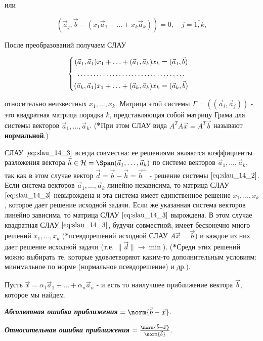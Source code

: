 или

$$(\vec{a}_j, \vec{b} - (x_1\vec{a}_1 + \ldots + x_k\vec{a}_k)) = 0, \quad j = \overline{1, k},$$

\bigbreak

После преобразований получаем СЛАУ

\begin{equation}
    \begin{cases}
        \begin{aligned}
            (\vec{a}_1, \vec{a}_1) x_1 + \ldots + (\vec{a}_1, \vec{a}_k)x_k &= (\vec{a}_1, \vec{b}) \\
            \hdotsfor{2} \\
            (\vec{a}_k, \vec{a}_1) x_1 + \ldots + (\vec{a}_k, \vec{a}_k)x_k &= (\vec{a}_k, \vec{b}) \\
        \end{aligned}
    \end{cases}
    \label{eq:slau_14_3}
\end{equation}

относительно неизвестных $x_1, \ldots, x_k$. Матрица этой системы $\Gamma = ((\vec{a}_i, \vec{a}_j))$ - это квадратная матрица порядка $k$, представляющая собой матрицу Грама для системы векторов $\vec{a}_1, \ldots, \vec{a}_k$. (\textbf{*}При этом СЛАУ вида $A^TA\vec{x} = A^T\vec{b}$ называют \textbf{нормальной}.)

СЛАУ $\eqref{eq:slau_14_3}$ всегда совместна: ее решениями являются коэффициенты разложения вектора $\vec{h} \in \mathcal{H} = \Span(\vec{a}_1, \ldots, \vec{a}_k)$ по системе векторов $\vec{a}_1, \ldots, \vec{a}_k$, так как в этом случае вектор $\vec{d} = \vec{b} - \vec{h} = \vec{h}^\perp$ - решение системы $\eqref{eq:slau_14_2}$. Если система векторов $\vec{a}_1, \ldots, \vec{a}_k$ линейно независима, то матрица СЛАУ $\eqref{eq:slau_14_3}$ невырождена и эта система имеет единственное решение $x_1, \ldots, x_k$, которое дает решение исходной задачи. Если же указанная система векторов линейно зависима, то матрица СЛАУ $\eqref{eq:slau_14_3}$ вырождена. В этом случае квадратная СЛАУ $\eqref{eq:slau_14_3}$, будучи совместной, имеет бесконечно много решений $x_1, \ldots, x_k$ (\textbf{*}псевдорешений исходной СЛАУ $A\vec{x} = \vec{b}$) и каждое из них дает решение исходной задачи (т.е. $\lVert \vec{d} \rVert \to \min$). (\textbf{*}Среди этих решений можно выбирать те, которые удовлетворяют каким-то дополнительным условиям: минимальное по норме (нормальное псевдорешение) и др.).

\bigbreak

Пусть $\vec{x} = \alpha_1\vec{a}_1 + \ldots + \alpha_n\vec{a}_n$ - и есть то наилучшее приближение вектора $\vec{b}$, которое мы найдем.

\textbf{\textit{Абсолютная ошибка приближения}} $= \norm{\vec{b} - \vec{x}}$.

\textbf{\textit{Относительная ошибка приближения}} $= \frac{\norm{\vec{b} - \vec{x}}}{\norm{\vec{b}}}$.
